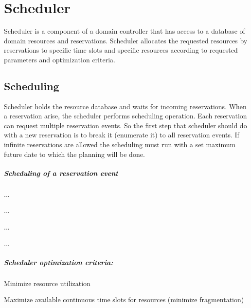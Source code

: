 \chapter{Scheduler}

Scheduler is a component of a domain controller that has access to a database 
of domain resources and reservations. Scheduler allocates the requested 
resources by reservations to specific time slots and specific resources 
according to requested parameters and optimization criteria.

\section{Scheduling}

Scheduler holds the resource database and waits for incoming reservations. When a reservation arise, the scheduler performs scheduling operation. Each reservation can request multiple reservation events. So the first step that
scheduler should do with a new reservation is to break it (enumerate it) to
all reservation events. If infinite reservations are allowed the scheduling must run with a set maximum future date to which the planning will be done.

\paragraph{Scheduling of a reservation event}
{
\renewcommand{\labelenumi}{\arabic{enumi}.}
\renewcommand{\labelenumii}{\arabic{enumi}.\arabic{enumii}}
\begin{compactenum}
\item ...
  \begin{compactenum}
  \item ...
  \item ...
  \end{compactenum}
\item ...
\end{compactenum}
}



\paragraph{Scheduler optimization criteria:}
\begin{compactitem}
\item Minimize resource utilization
\item Maximize available continuous time slots for resources (minimize 
  fragmentation)
\end{compactitem}
